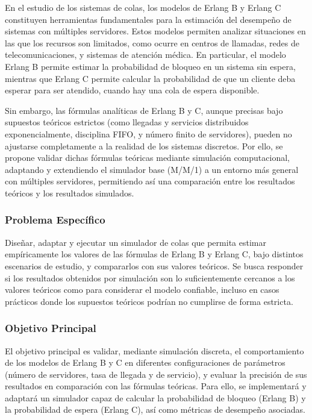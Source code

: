 \documentclass{article}
\begin{document}
En el estudio de los sistemas de colas, los modelos de Erlang B y Erlang C constituyen herramientas fundamentales para la estimación del desempeño de sistemas con múltiples servidores. Estos modelos permiten analizar situaciones en las que los recursos son limitados, como ocurre en centros de llamadas, redes de telecomunicaciones, y sistemas de atención médica. En particular, el modelo Erlang B permite estimar la probabilidad de bloqueo en un sistema sin espera, mientras que Erlang C permite calcular la probabilidad de que un cliente deba esperar para ser atendido, cuando hay una cola de espera disponible.

Sin embargo, las fórmulas analíticas de Erlang B y C, aunque precisas bajo supuestos teóricos estrictos (como llegadas y servicios distribuidos exponencialmente, disciplina FIFO, y número finito de servidores), pueden no ajustarse completamente a la realidad de los sistemas discretos. Por ello, se propone validar dichas fórmulas teóricas mediante simulación computacional, adaptando y extendiendo el simulador base (M/M/1) a un entorno más general con múltiples servidores, permitiendo así una comparación entre los resultados teóricos y los resultados simulados.

\subsubsection{Problema Específico}

Diseñar, adaptar y ejecutar un simulador de colas que permita estimar empíricamente los valores de las fórmulas de Erlang B y Erlang C, bajo distintos escenarios de estudio, y compararlos con sus valores teóricos. Se busca responder si los resultados obtenidos por simulación son lo suficientemente cercanos a los valores teóricos como para considerar el modelo confiable, incluso en casos prácticos donde los supuestos teóricos podrían no cumplirse de forma estricta.

\subsubsection{Objetivo Principal}

El objetivo principal es validar, mediante simulación discreta, el comportamiento de los modelos de Erlang B y C en diferentes configuraciones de parámetros (número de servidores, tasa de llegada y de servicio), y evaluar la precisión de sus resultados en comparación con las fórmulas teóricas. Para ello, se implementará y adaptará un simulador capaz de calcular la probabilidad de bloqueo (Erlang B) y la probabilidad de espera (Erlang C), así como métricas de desempeño asociadas.
\end{document}
